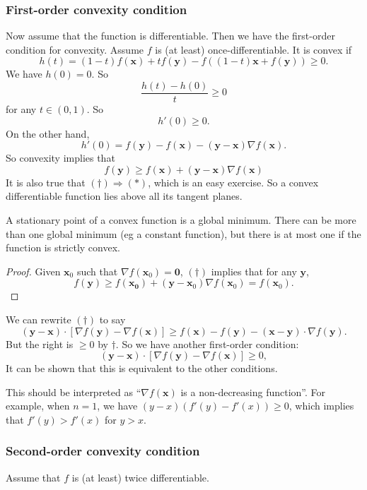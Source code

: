 \documentclass[a4paper]{article}
\begin{document}
\subsubsection{First-order convexity condition}
Now assume that the function is differentiable. Then we have the first-order condition for convexity. Assume $f$ is (at least) once-differentiable. It is convex if
\[
  h(t) = (1 - t)f(\mathbf{x}) + tf(\mathbf{y}) - f((1 - t)\mathbf{x} + f(\mathbf{y})) \geq 0.
\]
We have $h(0) = 0$. So
\[
  \frac{h(t) - h(0)}{t} \geq 0
\]
for any $t\in (0, 1)$. So
\[
  h'(0) \geq 0.
\]
On the other hand,
\[
  h'(0) = f(\mathbf{y}) - f(\mathbf{x}) - (\mathbf{y} - \mathbf{x})\nabla f (\mathbf{x}).
\]
So convexity implies that
\[
  f(\mathbf{y}) \geq f(\mathbf{x}) + (\mathbf{y} - \mathbf{x})\nabla f(\mathbf{x}) \tag{$\dagger$}
\]
It is also true that $(\dagger)\Rightarrow (*)$, which is an easy exercise. So a convex differentiable function lies above all its tangent planes.

\begin{cor}
  A stationary point of a convex function is a global minimum. There can be more than one global minimum (eg a constant function), but there is at most one if the function is strictly convex.
\end{cor}

\begin{proof}
  Given $\mathbf{x}_0$ such that $\nabla f(\mathbf{x}_0) = \mathbf{0}$, $(\dagger)$ implies that for any $\mathbf{y}$,
  \[
    f(\mathbf{y}) \geq f(\mathbf{x_0}) + (\mathbf{y} - \mathbf{x}_0)\nabla f(\mathbf{x}_0) = f(\mathbf{x}_0).
  \]
\end{proof}

We can rewrite $(\dagger)$ to say
\[
  (\mathbf{y} - \mathbf{x}) \cdot [\nabla f(\mathbf{y}) - \nabla f(\mathbf{x})] \geq f(\mathbf{x}) - f(\mathbf{y}) - (\mathbf{x} - \mathbf{y}) \cdot \nabla f(\mathbf{y}).
\]
But the right is $\geq 0$ by $\dagger$. So we have another first-order condition:
\[
  (\mathbf{y} - \mathbf{x})\cdot [\nabla f(\mathbf{y}) - \nabla f(\mathbf{x})]  \geq 0,
\]
It can be shown that this is equivalent to the other conditions.

This should be interpreted as ``$\nabla f(\mathbf{x})$ is a non-decreasing function''. For example, when $n = 1$, we have $(y - x)(f'(y) - f'(x)) \geq 0$, which implies that $f'(y) > f'(x)$ for $y > x$.

\subsubsection{Second-order convexity condition}
Assume that $f$ is (at least) twice differentiable.
\end{document}
